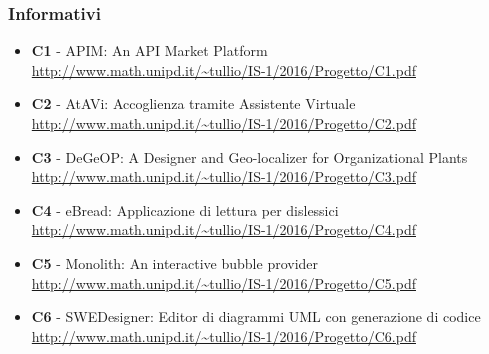 \subsubsection{Informativi}
\begin{itemize}
	\item \textbf{ C1} - APIM: An API Market Platform \\
	\url{http://www.math.unipd.it/~tullio/IS-1/2016/Progetto/C1.pdf}
	
	\item \textbf{ C2} - AtAVi: Accoglienza tramite Assistente Virtuale \\
	\url{http://www.math.unipd.it/~tullio/IS-1/2016/Progetto/C2.pdf}
	
	\item \textbf{ C3} - DeGeOP: A Designer and Geo-localizer  for Organizational Plants \\
	\url{http://www.math.unipd.it/~tullio/IS-1/2016/Progetto/C3.pdf}
	
	\item \textbf{ C4} - eBread: Applicazione di lettura per dislessici \\
	\url{http://www.math.unipd.it/~tullio/IS-1/2016/Progetto/C4.pdf}
	
	\item \textbf{ C5} - Monolith: An interactive bubble provider \\
	\url{http://www.math.unipd.it/~tullio/IS-1/2016/Progetto/C5.pdf}
	
	\item \textbf{ C6} - SWEDesigner: Editor di diagrammi UML con generazione di codice \\
	\url{http://www.math.unipd.it/~tullio/IS-1/2016/Progetto/C6.pdf}
\end{itemize}


\newpage